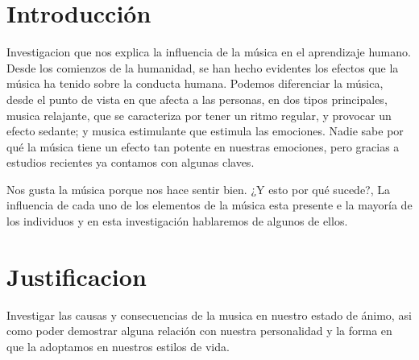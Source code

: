 \documentclass{bmcart}
\begin{document}



\section*{Introducción}

Investigacion que nos explica la influencia de la música en el aprendizaje humano.
Desde los comienzos de la humanidad, se han hecho evidentes los efectos que la música ha tenido sobre la conducta humana.
Podemos diferenciar la música, desde el punto de vista en que afecta a las personas, en dos tipos principales, musica relajante, que se caracteriza por tener un ritmo regular, y provocar un efecto sedante; y musica  estimulante que estimula las emociones. 
Nadie sabe por qué la música tiene un efecto tan potente en nuestras emociones, pero gracias a estudios recientes ya contamos con algunas claves.

Nos gusta la música porque nos hace sentir bien. ¿Y esto por qué sucede?, La influencia de cada uno de los elementos de la música esta presente e  la mayoría de los individuos y en esta investigación hablaremos de algunos de ellos.

\section*{Justificacion}
Investigar las causas y consecuencias de la musica en nuestro estado de ánimo, asi como poder demostrar alguna relación con nuestra personalidad y la forma en que la adoptamos en nuestros estilos de vida.
\end{document}
